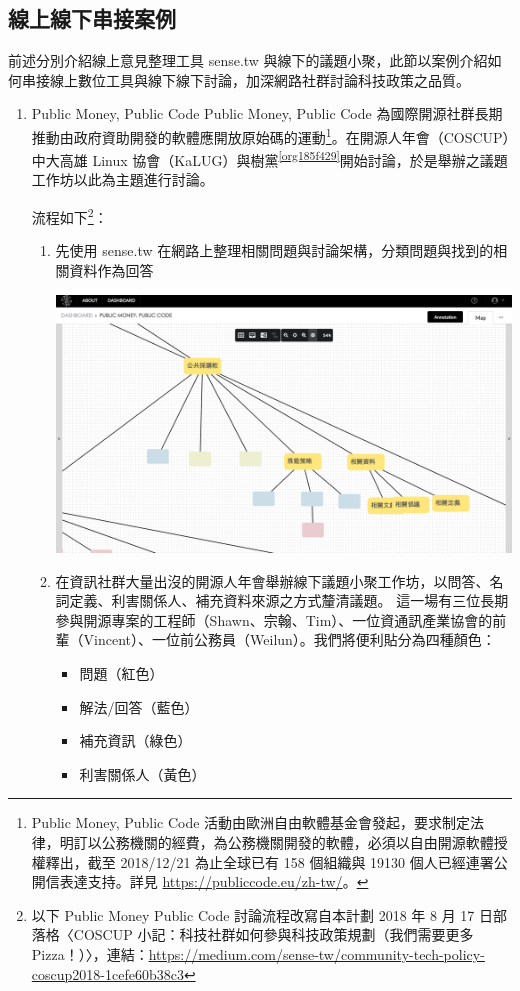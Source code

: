 \documentclass[12pt,a4paper]{article}
\begin{document}
\subsection{線上線下串接案例 }
\label{sec:org13a814f}
前述分別介紹線上意見整理工具 sense.tw 與線下的議題小聚，此節以案例介紹如何串接線上數位工具與線下線下討論，加深網路社群討論科技政策之品質。
\begin{enumerate}
\item Public Money, Public Code
\label{sec:org1b5a136}
Public Money, Public Code 為國際開源社群長期推動由政府資助開發的軟體應開放原始碼的運動\footnote{Public Money, Public Code 活動由歐洲自由軟體基金會發起，要求制定法律，明訂以公務機關的經費，為公務機關開發的軟體，必須以自由開源軟體授權釋出，截至 2018/12/21 為止全球已有 158 個組織與 19130 個人已經連署公開信表達支持。詳見 \url{https://publiccode.eu/zh-tw/}。}。在開源人年會（COSCUP）中大高雄 Linux 協會（KaLUG）與樹黨\textsuperscript{\ref{org185f429}}開始討論，於是舉辦之議題工作坊以此為主題進行討論。

流程如下\footnote{以下 Public Money Public Code 討論流程改寫自本計劃 2018 年 8 月 17 日部落格〈COSCUP 小記：科技社群如何參與科技政策規劃（我們需要更多 Pizza！）〉，連結：\url{https://medium.com/sense-tw/community-tech-policy-coscup2018-1cefe60b38c3}}：
\begin{enumerate}
\item 先使用 sense.tw 在網路上整理相關問題與討論架構，分類問題與找到的相關資料作為回答
\begin{center}
\includegraphics[width=.9\linewidth]{./images/pmpc2.png}
\end{center}
\item 在資訊社群大量出沒的開源人年會舉辦線下議題小聚工作坊，以問答、名詞定義、利害關係人、補充資料來源之方式釐清議題。
這一場有三位長期參與開源專案的工程師（Shawn、宗翰、Tim）、一位資通訊產業協會的前輩（Vincent）、一位前公務員（Weilun）。我們將便利貼分為四種顏色：
\begin{itemize}
\item 問題（紅色）
\item 解法/回答（藍色）
\item 補充資訊（綠色）
\item 利害關係人（黃色）


\end{itemize}
\end{enumerate}
\end{enumerate}
\end{document}
